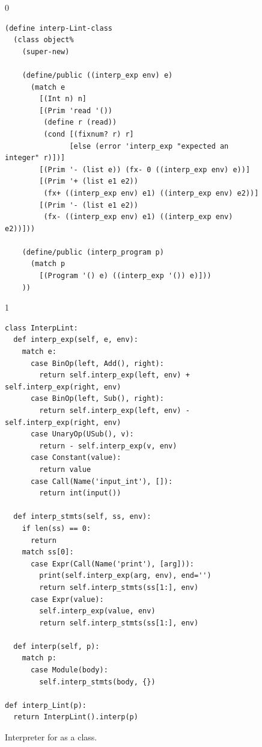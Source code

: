 \documentclass[7x10]{TimesAPriori_MIT}%
\def\racketEd{0}
\def\pythonEd{1}
\def\edition{0}
\numberwithin{theorem}{chapter}
\numberwithin{definition}{chapter}
\numberwithin{equation}{chapter}
\begin{document}
\begin{figure}[tp]
\begin{tcolorbox}[colback=white]
{\if\edition\racketEd
\begin{lstlisting}
(define interp-Lint-class
  (class object%
    (super-new)
    
    (define/public ((interp_exp env) e)
      (match e
        [(Int n) n]
        [(Prim 'read '())
         (define r (read))
         (cond [(fixnum? r) r]
               [else (error 'interp_exp "expected an integer" r)])]
        [(Prim '- (list e)) (fx- 0 ((interp_exp env) e))]
        [(Prim '+ (list e1 e2))
         (fx+ ((interp_exp env) e1) ((interp_exp env) e2))]
        [(Prim '- (list e1 e2))
         (fx- ((interp_exp env) e1) ((interp_exp env) e2))]))

    (define/public (interp_program p)
      (match p
        [(Program '() e) ((interp_exp '()) e)]))
    ))
\end{lstlisting}
\fi}
{\if\edition\pythonEd
\begin{lstlisting}
class InterpLint:
  def interp_exp(self, e, env):
    match e:
      case BinOp(left, Add(), right):
        return self.interp_exp(left, env) + self.interp_exp(right, env)
      case BinOp(left, Sub(), right):
        return self.interp_exp(left, env) - self.interp_exp(right, env)
      case UnaryOp(USub(), v):
        return - self.interp_exp(v, env)
      case Constant(value):
        return value
      case Call(Name('input_int'), []):
        return int(input())            

  def interp_stmts(self, ss, env):
    if len(ss) == 0:
      return
    match ss[0]:
      case Expr(Call(Name('print'), [arg])):
        print(self.interp_exp(arg, env), end='')
        return self.interp_stmts(ss[1:], env)
      case Expr(value):
        self.interp_exp(value, env)
        return self.interp_stmts(ss[1:], env)

  def interp(self, p):
    match p:
      case Module(body):
        self.interp_stmts(body, {})

def interp_Lint(p):
  return InterpLint().interp(p)
\end{lstlisting}
\fi}
\end{tcolorbox}
\caption{Interpreter for \LangInt{} as a class.}
\label{fig:interp-Lint-class}
\end{figure}
\end{document}
